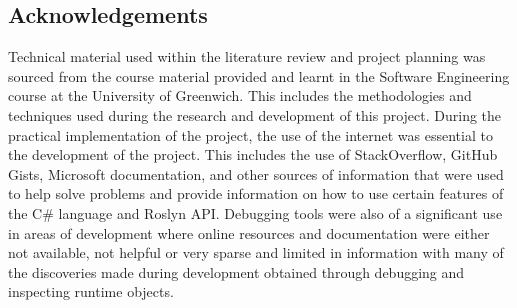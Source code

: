 \subsection*{Acknowledgements}


Technical material used within the literature review and project planning was sourced from the course material provided and learnt in the Software Engineering course at the University of Greenwich. This includes the methodologies and techniques used during the research and development of this project.
During the practical implementation of the project, the use of the internet was essential to the development of the project. This includes the use of StackOverflow, GitHub Gists, Microsoft documentation, and other sources of information that were used to help solve problems and provide information on how to use certain features of the C\# language and Roslyn API. Debugging tools were also of a significant use in areas of development where online resources and documentation were either not available, not helpful or very sparse and limited in information with many of the discoveries made during development obtained through debugging and inspecting runtime objects.
